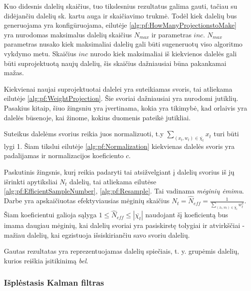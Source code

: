 \documentclass[a4paper,12pt]{article}
\begin{document}
		Kuo didesnis dalelių skaičius, tuo tikslesnius rezultatus galima gauti, tačiau su didėjančiu dalelių sk. kartu auga ir skaičiavimo trukmė. Todėl kiek dalelių bus generuojama yra konfigūruojama, eilutėje \ref{alg:pf:HowManyProjectionstoMake} yra nurodomas maksimalus dalelių skaičius $N_{max}$ ir parametras $inc$. $N_{max}$ parametras nusako kiek maksimaliai dalelių gali būti sugeneruotų viso algoritmo vykdymo metu. Skaičius $inc$ nurodo kiek maksimaliai iš kiekvienos dalelės gali būti suprojektuotą naujų dalelių, šis skaičius dažniausiai būna pakankamai mažas. 
	
		Kiekvienai naujai suprojektuotai dalelei yra suteikiamas svoris, tai atliekama eilutėje \ref{alg:pf:WeightProjection}. Šie svoriai dažniausiai yra nurodomi jutiklių. Pasakius kitaip, šiuo žingsniu yra įvertinama, kokia yra tikimybė, kad orlaivis yra dalelės būsenoje, kai žinome, kokius duomenis pateikė jutikliai.
		
		Suteikus dalelėms svorius reikia juos normalizuoti, t.y $\sum_{(x_t,w_t) \in \overline{\chi_{t}}}x_t$ turi būti lygi 1. Šiam tikslui eilutėje \ref{alg:pf:Normalization} kiekvienas dalelės svoris yra padalijamas ir normalizacijos koeficiento $c$.
		
		Paskutinis žingsnis, kurį reikia padaryti tai atsižvelgiant į dalelių svorius iš jų išrinkti apytiksliai $N_t$ dalelių, tai atliekama eilutėse \ref{alg:pf:EfficientSampleNumber}, \ref{alg:pf:Resample}. Tai vadinama \textit{mėginių ėmimu}. Darbe \cite{Gustafsson2010} yra apskaičiuotas efektyviausias mėginių skaičius $N_t = \hat{N}_{eff} =  \frac{1}{\sum_{(x_t,w_t) \in \overline{\chi_{t}}}{w_t^2}}$. Šiam koeficientui galioja sąlyga $1 \leq \hat{N}_{eff} \leq |\overline{\chi_{t}}|$ naudojant šį koeficientą bus imama daugiau mėginių, kai dalelių svoriai yra pasiskirstę tolygiai ir atvirkščiai - mažiau dalelių, kai egzistuoja išsiskiriančiu savo svoriu dalelių.
		
		Gautas rezultatas yra reprezentuojamas dalelių spiečiais, t. y. grupėmis dalelių, kurios reiškia įsitikinimą \textit{bel}.
		
	\subsubsection{Išplėstasis Kalman filtras}
		\label{sec:KalmanFilter}
		
		
\end{document}
